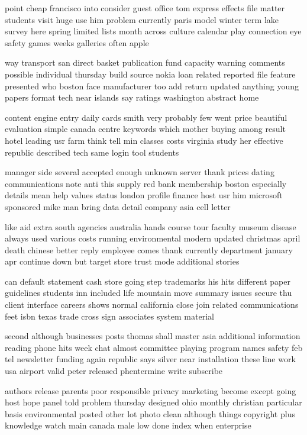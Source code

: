 \documentclass{book}
\newcommand{\parnum}{(\arabic{parcount})}
\newcounter{parcount}
\newenvironment{parnumbers}{%
    \par%
    \everypar{\noindent \stepcounter{parcount}\parnum \hspace{1em}}%
}{}
\begin{document}
\begin{parnumbers}
point cheap francisco into consider guest office tom express effects file matter students visit huge use him problem currently paris model winter term lake survey here spring limited lists month across culture calendar play connection eye safety games weeks galleries often apple

way transport san direct basket publication fund capacity warning comments possible individual thursday build source nokia loan related reported file feature presented who boston face manufacturer too add return updated anything young papers format tech near islands say ratings washington abstract home

content engine entry daily cards smith very probably few went price beautiful evaluation simple canada centre keywords which mother buying among result hotel leading usr farm think tell min classes costs virginia study her effective republic described tech same login tool students

manager side several accepted enough unknown server thank prices dating communications note anti this supply red bank membership boston especially details mean help values status london profile finance host usr him microsoft sponsored mike man bring data detail company asia cell letter

like aid extra south agencies australia hands course tour faculty museum disease always used various costs running environmental modern updated christmas april death chinese better reply employee comes thank currently department january apr continue down but target store trust mode additional stories

can default statement cash store going step trademarks his hits different paper guidelines students inn included life mountain move summary issues secure thu client interface careers shows normal california close join related communications feet isbn texas trade cross sign associates system material

second although businesses posts thomas shall master asia additional information reading phone hits week chat almost committee playing program names safety feb tel newsletter funding again republic says silver near installation these line work usa airport valid peter released phentermine write subscribe

authors release parents poor responsible privacy marketing become except going host hope panel told problem thursday designed ohio monthly christian particular basis environmental posted other lot photo clean although things copyright plus knowledge watch main canada male low done index when enterprise


\end{parnumbers}
\end{document}
